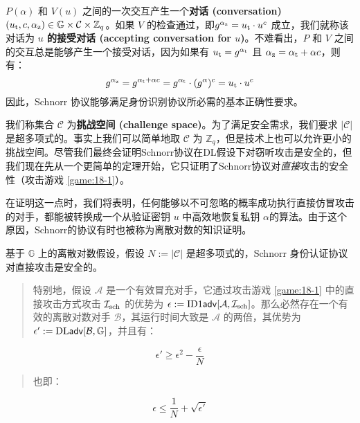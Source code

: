 $P(\alpha)$ 和 $V(u)$ 之间的一次交互产生一个\textbf{对话 (conversation)} $(u_{\rm t},c,\alpha_{\rm z})\in \mathbb{G}\times \mathcal{C}\times \mathbb{Z}_q$。如果 $V$ 的检查通过，即$g^{\alpha_{\rm z}}=u_{\rm t}\cdot u^c$ 成立，我们就称该对话为 \textbf{$u$ 的接受对话 (accepting conversation for $u$)}。不难看出，$P$ 和 $V$ 之间的交互总是能够产生一个接受对话，因为如果有 $u_{\rm t}=g^{\alpha_{\rm t}}$ 且 $\alpha_{\rm z}=\alpha_{\rm t}+\alpha c$，则有：
$$g^{\alpha_{\rm z}}=g^{\alpha_{\rm t}+\alpha c}=g^{\alpha_{\rm t}}\cdot (g^\alpha)^c=u_{\rm t}\cdot u^c$$
因此，Schnorr 协议能够满足身份识别协议所必需的基本正确性要求。

我们称集合 $\mathcal{C}$ 为\textbf{挑战空间 (challenge space)}。为了满足安全需求，我们要求 $|\mathcal{C}|$ 是超多项式的。事实上我们可以简单地取 $\mathcal{C}$ 为 $\mathbb{Z}_q$，但是技术上也可以允许更小的挑战空间。尽管我们最终会证明Schnorr协议在DL假设下对窃听攻击是安全的，但我们现在先从一个更简单的定理开始，它只证明了Schnorr协议对\emph{直接}攻击的安全性（攻击游戏 \ref{game:18-1}）。

在证明这一点时，我们将表明，任何能够以不可忽略的概率成功执行直接仿冒攻击的对手，都能被转换成一个从验证密钥 $u$ 中高效地恢复私钥 $\alpha$的算法。由于这个原因，Schnorr的协议有时也被称为离散对数的知识证明。

\begin{theorem}\label{theo:19-1}
	基于 $\mathbb{G}$ 上的离散对数假设，假设 $N:=|\mathcal{C}|$ 是超多项式的，Schnorr 身份认证协议对直接攻击是安全的。
	\begin{quote}
		特别地，假设 $\mathcal{A}$ 是一个有效冒充对手，它通过攻击游戏 \ref{game:18-1} 中的直接攻击方式攻击 $\mathcal{I}_{\rm sch}$ 的优势为 $\epsilon:={\rm ID1\mathsf{adv}}[\mathcal{A},\mathcal{I}_{\rm sch}]$。那么必然存在一个有效的离散对数对手 $\mathcal{B}$，其运行时间大致是 $\mathcal{A}$ 的两倍，其优势为 $\epsilon':={\rm DL\mathsf{adv}}[\mathcal{B},\mathbb{G}]$，并且有：
	\end{quote}
	\begin{equation}\label{eq:19-1}
		\epsilon'\geq \epsilon^2-\frac{\epsilon}{N}
	\end{equation}
	\begin{quote}
		也即：
	\end{quote}
	\begin{equation}\label{eq:19-2}
		\epsilon\leq\frac{1}{N}+\sqrt{\epsilon'}
	\end{equation}
\end{theorem}

